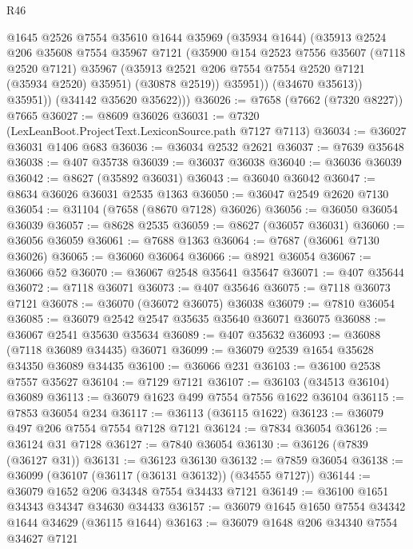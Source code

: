 \begin{lexlean}{R46}
\begin{coremodule}
                @1645
                @2526
                @7554
                @35610
                @1644
                @35969
                (@35934 @1644)
                (@35913
                  @2524
                  @206
                  @35608
                  @7554
                  @35967
                  @7121
                  (@35900
                    @154
                    @2523
                    @7556
                    @35607
                    (@7118 @2520 @7121)
                    @35967
                    (@35913 @2521 @206 @7554 @7554 @2520 @7121 (@35934 @2520) @35951)
                    (@30878 @2519))
                  @35951))
              (@34670 @35613))
            @35951))
        (@34142 @35620 @35622)))
@36026 := @7658 (@7662 (@7320 @8227)) @7665
@36027 := @8609 @36026
@36031 := @7320 (LexLeanBoot.ProjectText.LexiconSource.path @7127 @7113)
@36034 := @36027 @36031 @1406 @683
@36036 := @36034 @2532 @2621
@36037 := @7639 @35648
@36038 := @407 @35738
@36039 := @36037 @36038
@36040 := @36036 @36039
@36042 := @8627 (@35892 @36031)
@36043 := @36040 @36042
@36047 := @8634 @36026 @36031 @2535 @1363
@36050 := @36047 @2549 @2620 @7130
@36054 := @31104 (@7658 (@8670 @7128) @36026)
@36056 := @36050 @36054 @36039
@36057 := @8628 @2535
@36059 := @8627 (@36057 @36031)
@36060 := @36056 @36059
@36061 := @7688 @1363
@36064 := @7687 (@36061 @7130 @36026)
@36065 := @36060 @36064
@36066 := @8921 @36054
@36067 := @36066 @52
@36070 := @36067 @2548 @35641 @35647
@36071 := @407 @35644
@36072 := @7118 @36071
@36073 := @407 @35646
@36075 := @7118 @36073 @7121
@36078 := @36070 (@36072 @36075) @36038
@36079 := @7810 @36054
@36085 := @36079 @2542 @2547 @35635 @35640 @36071 @36075
@36088 := @36067 @2541 @35630 @35634
@36089 := @407 @35632
@36093 := @36088 (@7118 @36089 @34435) @36071
@36099 := @36079 @2539 @1654 @35628 @34350 @36089 @34435
@36100 := @36066 @231
@36103 := @36100 @2538 @7557 @35627
@36104 := @7129 @7121
@36107 := @36103 (@34513 @36104) @36089
@36113 := @36079 @1623 @499 @7554 @7556 @1622 @36104
@36115 := @7853 @36054 @234
@36117 := @36113 (@36115 @1622)
@36123 := @36079 @497 @206 @7554 @7554 @7128 @7121
@36124 := @7834 @36054
@36126 := @36124 @31 @7128
@36127 := @7840 @36054
@36130 := @36126 (@7839 (@36127 @31))
@36131 := @36123 @36130
@36132 := @7859 @36054
@36138 := @36099 (@36107 (@36117 (@36131 @36132)) (@34555 @7127))
@36144 := @36079 @1652 @206 @34348 @7554 @34433 @7121
@36149 := @36100 @1651 @34343 @34347 @34630 @34433
@36157 := @36079 @1645 @1650 @7554 @34342 @1644 @34629 (@36115 @1644)
@36163 := @36079 @1648 @206 @34340 @7554 @34627 @7121

\end{coremodule}
\end{lexlean}
